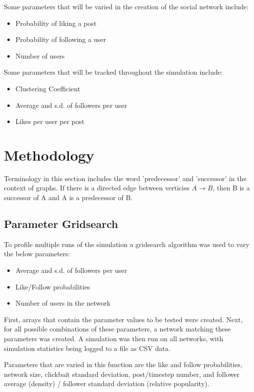 \documentclass{article}
\begin{document}
Some parameters that will be varied in the creation of the social network include:
\begin{itemize}
    \item Probability of liking a post
    \item Probability of following a user
    \item Number of users
\end{itemize}

Some parameters that will be tracked throughout the simulation include:
\begin{itemize}
    \item Clustering Coefficient
    \item Average and s.d. of followers per user
    \item Likes per user per post
\end{itemize}

\section{Methodology}

Terminology in this section includes the word 'predecessor' and 'successor'
in the context of graphs. If there is a directed edge between verticies
$A \rightarrow B$, then B is a successor of A and A is a predecessor of B.

\subsection{Parameter Gridsearch}

To profile multiple runs of the simulation a gridsearch algorithm was used
to vary the below parameters:
\begin{itemize}
\item Average and s.d. of followers per user
\item Like/Follow probabilities
\item Number of users in the network
\end{itemize}

First, arrays that contain the parameter values to be tested were created.
Next, for all possible combinations of these parameters, a network
matching these parameters was created. A simulation was then run on all networks,
with simulation statistics being logged to a file as CSV data.

Parameters that are varied in this function are the like and follow probabilities,
network size, clickbait standard deviation, post/timestep number, and
follower average (density) / follower standard deviation (relative popularity).
\end{document}
